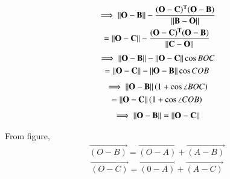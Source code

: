 \documentclass[journal,12pt,twocolumn]{IEEEtran}
\begin{document}
\begin{multline}
    \implies \left\lVert\mathbf{O-B}\right\rVert - \frac{\mathbf{(O-C)^T(O-B)}}{\left\lVert\mathbf{B-O}\right\rVert} \\
    = \left\lVert\mathbf{O-C}\right\rVert - \frac{\mathbf{(O-C)^T(O-B)}}{\left\lVert\mathbf{C-O}\right\rVert}
\end{multline}
\begin{multline}
    \implies \left\lVert\mathbf{O-B}\right\rVert - \left\lVert\mathbf{O-C}\right\rVert\cos BOC \\
    = \left\lVert\mathbf{O-C}\right\rVert - \left\lVert\mathbf{O-B}\right\rVert\cos COB
\end{multline}
\begin{multline}
    \implies \left\lVert\mathbf{O-B}\right\rVert \left(1+\cos \angle BOC\right) \\
    = \left\lVert\mathbf{O-C}\right\rVert\left(1+\cos \angle COB\right)
\end{multline}
\begin{align}
    \implies \left\lVert\mathbf{O-B}\right\rVert = \left\lVert\mathbf{O-C}\right\rVert \label{eq:4}
\end{align}

From figure,
\begin{align}
    \vec{(O-B)}=\vec{(O-A)}+\vec{(A-B)} \label{eq:5}
\end{align}
\begin{align}
    \vec{(O-C)}=\vec{(0-A)}+\vec{(A-C)} \label{eq:6}
\end{align}
\end{document}
